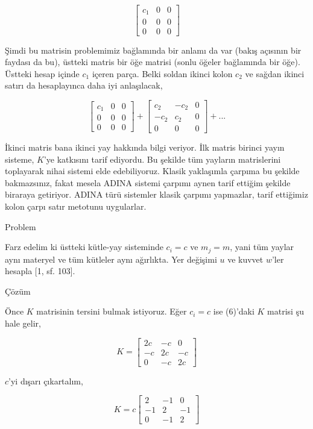 \documentclass[12pt,fleqn]{article}\usepackage{../../common}
\begin{document}
$$
\left[\begin{array}{rrr}
c_1 & 0 & 0 \\ 0 & 0 & 0 \\ 0 & 0 & 0 
\end{array}\right] 
$$

Şimdi bu matrisin problemimiz bağlamında bir anlamı da var (bakış açısının bir
faydası da bu), üstteki matris bir öğe matrisi (sonlu öğeler bağlamında bir
öğe). Üstteki hesap içinde $c_1$ içeren parça. Belki soldan ikinci kolon $c_2$
ve sağdan ikinci satırı da hesaplayınca daha iyi anlaşılacak,

$$
\left[\begin{array}{rrr}
c_1 & 0 & 0 \\ 0 & 0 & 0 \\ 0 & 0 & 0 
\end{array}\right]
+
\left[\begin{array}{rrr}
c_2 & -c_2 & 0 \\ -c_2 & c_2 & 0 \\ 0 & 0 & 0 
\end{array}\right]
+ ...
$$

İkinci matris bana ikinci yay hakkında bilgi veriyor. İlk matris birinci yayın
sisteme, $K$'ye katkısını tarif ediyordu. Bu şekilde tüm yayların matrislerini
toplayarak nihai sistemi elde edebiliyoruz. Klasik yaklaşımla çarpıma bu şekilde
bakmazsınız, fakat mesela ADINA sistemi çarpımı aynen tarif ettiğim şekilde
biraraya getiriyor. ADINA türü sistemler klasik çarpımı yapmazlar, tarif
ettiğimiz kolon çarpı satır metotunu uygularlar.

Problem

Farz edelim ki üstteki kütle-yay sisteminde $c_i = c$ ve $m_j = m$, yani
tüm yaylar aynı materyel ve tüm kütleler aynı ağırlıkta. Yer değişimi $u$
ve kuvvet $w$'ler hesapla [1, sf. 103].

Çözüm

Önce $K$ matrisinin tersini bulmak istiyoruz. Eğer $c_i = c$ ise (6)'daki $K$
matrisi şu hale gelir,

$$ K = 
\left[\begin{array}{rrr}
2c   &     -c &       0 \\
-c       & 2c &     -c \\
0         & -c     &      2c
\end{array}\right]
$$

$c$'yi dışarı çıkartalım,

$$ K = c
\left[\begin{array}{rrr}
2   &     -1 &       0 \\
-1       & 2 &     -1 \\
0         & -1     &      2
\end{array}\right]
$$
\end{document}
